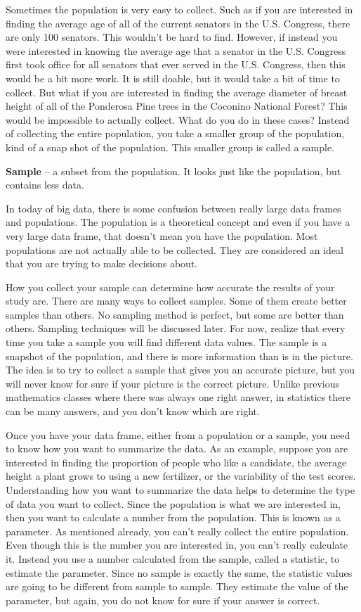 \documentclass[]{book}
\begin{document}
Sometimes the population is very easy to collect. Such as if you are interested in finding the average age of all of the current senators in the U.S. Congress, there are only 100 senators. This wouldn't be hard to find. However, if instead you were interested in knowing the average age that a senator in the U.S. Congress first took office for all senators that ever served in the U.S. Congress, then this would be a bit more work. It is still doable, but it would take a bit of time to collect. But what if you are interested in finding the average diameter of breast height of all of the Ponderosa Pine trees in the Coconino National Forest? This would be impossible to actually collect. What do you do in these cases? Instead of collecting the entire population, you take a smaller group of the population, kind of a snap shot of the population. This smaller group is called a sample.

\textbf{Sample} -- a subset from the population. It looks just like the population, but contains less data.

In today of big data, there is some confusion between really large data frames and populations. The population is a theoretical concept and even if you have a very large data frame, that doesn't mean you have the population. Most populations are not actually able to be collected. They are considered an ideal that you are trying to make decisions about.

How you collect your sample can determine how accurate the results of your study are. There are many ways to collect samples. Some of them create better samples than others. No sampling method is perfect, but some are better than others. Sampling techniques will be discussed later. For now, realize that every time you take a sample you will find different data values. The sample is a snapshot of the population, and there is more information than is in the picture. The idea is to try to collect a sample that gives you an accurate picture, but you will never know for sure if your picture is the correct picture. Unlike previous mathematics classes where there was always one right answer, in statistics there can be many answers, and you don't know which are right.

Once you have your data frame, either from a population or a sample, you need to know how you want to summarize the data. As an example, suppose you are interested in finding the proportion of people who like a candidate, the average height a plant grows to using a new fertilizer, or the variability of the test scores. Understanding how you want to summarize the data helps to determine the type of data you want to collect. Since the population is what we are interested in, then you want to calculate a number from the population. This is known as a parameter. As mentioned already, you can't really collect the entire population. Even though this is the number you are interested in, you can't really calculate it. Instead you use a number calculated from the sample, called a statistic, to estimate the parameter. Since no sample is exactly the same, the statistic values are going to be different from sample to sample. They estimate the value of the parameter, but again, you do not know for sure if your answer is correct.
\end{document}
